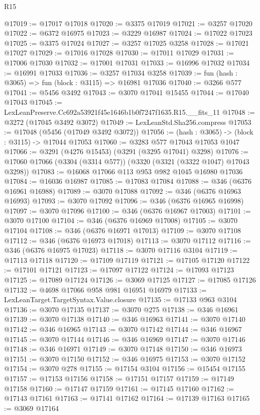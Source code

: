 \begin{lexlean}{R15}
\begin{coremodule}
@17019 := @17017 @17018
@17020 := @3375 @17019
@17021 := @3257 @17020
@17022 := @6372 @16975
@17023 := @3229 @16987
@17024 := @17022 @17023
@17025 := @3375 @17024
@17027 := @3257 @17025 @3258
@17028 := @17021 @17027
@17029 := @17016 @17028
@17030 := @17011 @17029
@17031 := @17006 @17030
@17032 := @17001 @17031
@17033 := @16996 @17032
@17034 := @16991 @17033
@17036 := @3257 @17034 @3258
@17039 := fun (hash : @3065) => fun (block : @3115) => @16981 @17036
@17040 := @3266 @577
@17041 := @5456 @3492
@17043 := @3070 @17041 @15455
@17044 := @17040 @17043
@17045 := LexLeanPreserve.Cc692a53921f45e1646b1b0f7247f1635.R15.__fits_11
@17048 := @3272 (@17045 @3492 @3072)
@17049 := LexLeanStd.Sha256.compress
@17053 := @17048 (@5456 (@17049 @3492 @3072))
@17056 := (hash : @3065) -> (block : @3115) -> @17044 @17053
@17060 := @3283 @577 @17043 @17053 @1047
@17066 := @3291 (@4276 @15453) (@3291 (@3295 @17041) @3298)
@17076 := @17060 @17066 (@3304 (@3314 @577)) (@3320 (@3321 (@3322 @1047) @17043 @3298))
@17083 := @16068 @17066 @113 @953 @982 @1045 @16980 @17036
@17084 := @16036 @16987
@17085 := @17083 @17084
@17088 := @346 (@6376 @16961 @16988)
@17089 := @3070 @17088
@17092 := @346 (@6376 @16963 @16993)
@17093 := @3070 @17092
@17096 := @346 (@6376 @16965 @16998)
@17097 := @3070 @17096
@17100 := @346 (@6376 @16967 @17003)
@17101 := @3070 @17100
@17104 := @346 (@6376 @16969 @17008)
@17105 := @3070 @17104
@17108 := @346 (@6376 @16971 @17013)
@17109 := @3070 @17108
@17112 := @346 (@6376 @16973 @17018)
@17113 := @3070 @17112
@17116 := @346 (@6376 @16975 @17023)
@17118 := @3070 @17116 @3104
@17119 := @17113 @17118
@17120 := @17109 @17119
@17121 := @17105 @17120
@17122 := @17101 @17121
@17123 := @17097 @17122
@17124 := @17093 @17123
@17125 := @17089 @17124
@17126 := @3069 @17125
@17127 := @17085 @17126
@17132 := @4698 @17066 @958 @981 @16951 @16979
@17133 := LexLeanTarget.TargetSyntax.Value.closure
@17135 := @17133 @963 @3104
@17136 := @3070 @17135
@17137 := @3070 @275
@17138 := @346 @16961
@17139 := @3070 @17138
@17140 := @346 @16963
@17141 := @3070 @17140
@17142 := @346 @16965
@17143 := @3070 @17142
@17144 := @346 @16967
@17145 := @3070 @17144
@17146 := @346 @16969
@17147 := @3070 @17146
@17148 := @346 @16971
@17149 := @3070 @17148
@17150 := @346 @16973
@17151 := @3070 @17150
@17152 := @346 @16975
@17153 := @3070 @17152
@17154 := @3070 @278
@17155 := @17154 @3104
@17156 := @15454 @17155
@17157 := @17153 @17156
@17158 := @17151 @17157
@17159 := @17149 @17158
@17160 := @17147 @17159
@17161 := @17145 @17160
@17162 := @17143 @17161
@17163 := @17141 @17162
@17164 := @17139 @17163
@17165 := @3069 @17164

\end{coremodule}
\end{lexlean}
